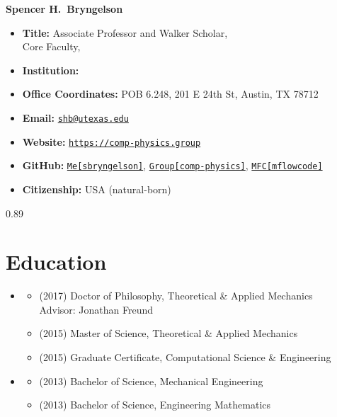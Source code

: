 




\begin{center}
    {\LARGE \bf Spencer H.\ Bryngelson} 
\end{center}

\begin{itemize}
    \item[] \textbf{Title:} Associate Professor and Walker Scholar, \Walker \\
         Core Faculty, \Oden
    \item[] \textbf{Institution:} \UTA
    \item[] \textbf{Office Coordinates:} POB 6.248, 201 E 24th St, Austin, TX 78712
    \item[] \textbf{Email:} \href{mailto:shb@utexas.edu}{\texttt{shb@utexas.edu}}
    \item[] \textbf{Website:} \href{https://comp-physics.group}{\texttt{https://comp-physics.group}}
    \item[] \textbf{GitHub:}
        \href{https://github.com/sbryngelson}{\tt Me[sbryngelson]}, 
        \href{https://github.com/comp-physics}{\tt Group[comp-physics]}, 
        \href{https://github.com/mflowcode}{\tt MFC[mflowcode]}
    \item[] \textbf{Citizenship:} USA (natural-born)
\end{itemize}

\vspace{-0.25cm}

\begingroup
\hypersetup{linkcolor=darkrust}    %
\begin{spacing}{0.89}
\setlength{\cftbeforesecskip}{1.5pt} 
\tableofcontents
\end{spacing}
\endgroup

\section{Education}

\begin{itemize}
    \item \UIUC
    \begin{itemize}
        \item[] (2017) Doctor of Philosophy, Theoretical \& Applied Mechanics \\
            \phantom{(2017)} Advisor: Jonathan Freund
        \item[] (2015) Master of Science, Theoretical \& Applied Mechanics
        \item[] (2015) Graduate Certificate, Computational Science \& Engineering
    \end{itemize}
    \item \UMD
    \begin{itemize}
        \item[] (2013) Bachelor of Science, Mechanical Engineering
        \item[] (2013) Bachelor of Science, Engineering Mathematics
    \end{itemize}
\end{itemize}


